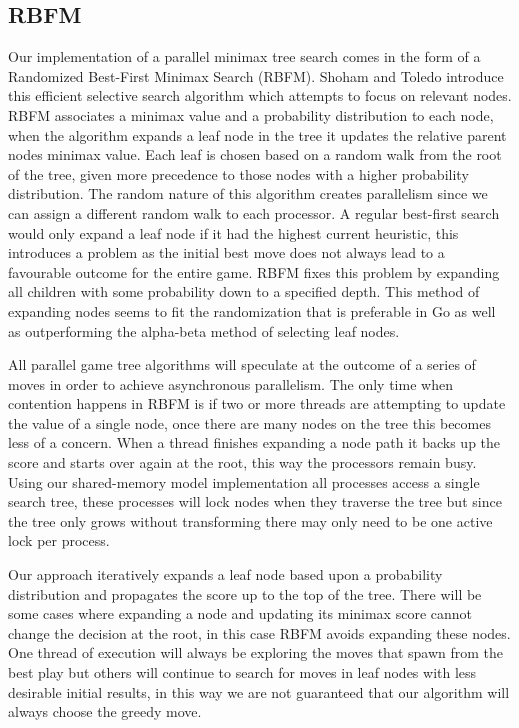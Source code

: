 \documentclass[conference]{IEEEtran}
\begin{document}
\subsection{RBFM}
Our implementation of a parallel minimax tree search comes in the form of a Randomized Best-First Minimax Search (RBFM). Shoham and Toledo introduce this efficient selective search algorithm which attempts to focus on relevant nodes. RBFM associates a minimax value and a probability distribution to each node, when the algorithm expands a leaf node in the tree it updates the relative parent nodes minimax value. Each leaf is chosen based on a random walk from the root of the tree, given more precedence to those nodes with a higher probability distribution. The random nature of this algorithm creates parallelism since we can assign a different random walk to each processor. A regular best-first search would only expand a leaf node if it had the highest current heuristic, this introduces a problem as the initial best move does not always lead to a favourable outcome for the entire game. RBFM fixes this problem by expanding all children with some probability down to a specified depth.  This method of expanding nodes seems to fit the randomization that is preferable in Go as well as outperforming the alpha-beta method of selecting leaf nodes.\par
All parallel game tree algorithms will speculate at the outcome of a series of moves in order to achieve asynchronous parallelism. The only time when contention happens in RBFM is if two or more threads are attempting to update the value of a single node, once there are many nodes on the tree this becomes less of a concern. When a thread finishes expanding a node path it backs up the score and starts over again at the root, this way the processors remain busy. Using our shared-memory model implementation all processes access a single search tree, these processes will lock nodes when they traverse the tree but since the tree only grows without transforming there may only need to be one active lock per process.\par
Our approach iteratively expands a leaf node based upon a probability distribution and propagates the score up to the top of the tree. There will be some cases where expanding a node and updating its minimax score cannot change the decision at the root, in this case RBFM avoids expanding these nodes. One thread of execution will always be exploring the moves that spawn from the best play but others will continue to search for moves in leaf nodes with less desirable initial results, in this way we are not guaranteed that our algorithm will always choose the greedy move.
\end{document}
